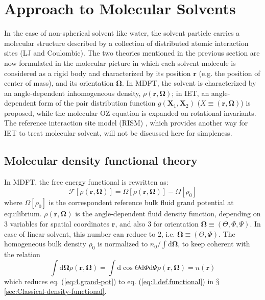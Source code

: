 
\chapter{Approach to Molecular Solvents\label{chpt:iem-mdft}}

In the case of non-spherical solvent like water, the solvent particle
carries a molecular structure described by a collection of distributed
atomic interaction sites (LJ and Coulombic). The two theories mentioned
in the previous section are now formulated in the molecular picture
in which each solvent molecule is considered as a rigid body and characterized
by its position $\mathbf{r}$ (e.g. the position of center of mass),
and its orientation $\mathbf{\Omega}$. In \acs{MDFT}, the solvent
is characterized by an angle-dependent inhomogeneous density, $\rho(\mathbf{r},\mathbf{\Omega})$;
in \acs{IET}, an angle-dependent form of the pair distribution function
$g(\mathbf{X}_{1},\mathbf{X}_{2})$ ($X\equiv(\mathbf{r},\mathbf{\Omega})$)
is proposed, while the molecular \acs{OZ} equation is expanded on
rotational invariants. The reference interaction site model (RISM)
\citep{hirata_molecular_2004}, which provides another way for \acs{IET}
to treat molecular solvent, will not be discussed here for simpleness.

\section{Molecular density functional theory}

In \acf{MDFT}, the free energy functional is rewritten as:
\begin{equation}
\mathcal{F}[\rho(\mathbf{r},\mathbf{\Omega})]=\varOmega[\rho(\mathbf{r},\mathbf{\Omega})]-\varOmega[\rho_{0}]\label{eq:4.grand-pot}
\end{equation}
where $\varOmega[\rho_{0}]$ is the correspondent reference bulk fluid
grand potential at equilibrium. $\rho(\mathbf{r},\mathbf{\Omega})$
is the angle-dependent fluid density function, depending on 3 variables
for spatial coordinates $\mathbf{r}$, and also 3 for orientation
$\mathbf{\Omega}\equiv(\Theta,\Phi,\Psi)$. In case of linear solvent,
this number can reduce to 2, i.e. $\mathbf{\Omega}\equiv(\Theta,\Phi)$.
The homogeneous bulk density $\rho_{0}$ is normalized to $n_{0}/\int\mathrm{d}\mathbf{\Omega}$,
to keep coherent with the relation
\begin{equation}
\int\mathrm{d}\mathbf{\Omega}\rho(\mathbf{r},\mathbf{\Omega})=\int\mathrm{d}\cos\Theta\mathrm{d}\Phi\mathrm{d}\Psi\rho(\mathbf{r},\mathbf{\Omega})=n(\mathbf{r})
\end{equation}
which reduces eq. (\ref{eq:4.grand-pot}) to eq. (\ref{eq:1.def.functional})
in $\mathsection$\ref{sec:Classical-density-functional}.


